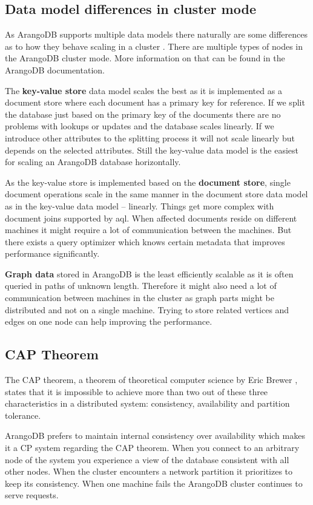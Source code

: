 \subsection{Data model differences in cluster mode}
As ArangoDB supports multiple data models there naturally are some differences as to how they behave scaling in a cluster \parencite{ArangoCluster}. There are multiple types of nodes in the ArangoDB cluster mode. More information on that can be found in the ArangoDB documentation.
\medskip

The \textbf{key-value store} data model scales the best as it is implemented as a document store where each document has a primary key for reference. If we split the database just based on the primary key of the documents there are no problems with lookups or updates and the database scales linearly. If we introduce other attributes to the splitting process it will not scale linearly but depends on the selected attributes. Still the key-value data model is the easiest for scaling an ArangoDB database horizontally.
\medskip

As the key-value store is implemented based on the \textbf{document store}, single document operations scale in the same manner in the document store data model as in the key-value data model -- linearly. Things get more complex with document joins supported by \gls{aql}. When affected documents reside on different machines it might require a lot of communication between the machines. But there exists a query optimizer which knows certain metadata that improves performance significantly.
\medskip

\textbf{Graph data} stored in ArangoDB is the least efficiently scalable as it is often queried in paths of unknown length. Therefore it might also need a lot of communication between machines in the cluster as graph parts might be distributed and not on a single machine. Trying to store related vertices and edges on one node can help improving the performance.

\subsection{CAP Theorem}
The CAP theorem, a theorem of theoretical computer science by Eric Brewer \parencite{Brewer2000}, states that it is impossible to achieve more than two out of these three characteristics in a distributed system: consistency, availability and partition tolerance.

ArangoDB prefers to maintain internal consistency over availability which makes it a CP system regarding the CAP theorem. When you connect to an arbitrary node of the system you experience a view of the database consistent with all other nodes. When the cluster encounters a network partition it prioritizes to keep its consistency. When one machine fails the ArangoDB cluster continues to serve requests. \parencite{ArangoCluster}


